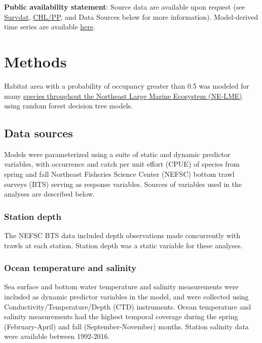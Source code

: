 \documentclass[
]{book}
\begin{document}
\textbf{Public availability statement}: Source data are available upon request (see \protect\hyperlink{survdat}{Survdat}, \protect\hyperlink{chl-pp}{CHL/PP}, and Data Sources below for more information). Model-derived time series are available \href{https://comet.nefsc.noaa.gov/erddap/tabledap/SOE_habitat_soe_v1.html}{here}.

\hypertarget{methods-26}{%
\section{Methods}\label{methods-26}}

Habitat area with a probability of occupancy greater than 0.5 was modeled for many \href{https://www.nefsc.noaa.gov/ecosys/current-conditions/occupancy-change.html}{species throughout the Northeast Large Marine Ecosystem (NE-LME)} using random forest decision tree models.

\hypertarget{data-sources-26}{%
\subsection{Data sources}\label{data-sources-26}}

Models were parameterized using a suite of static and dynamic predictor variables, with occurrence and catch per unit effort (CPUE) of species from spring and fall Northeast Fisheries Science Center (NEFSC) bottom trawl surveys (BTS) serving as response variables. Sources of variables used in the analyses are described below.

\hypertarget{station-depth}{%
\subsubsection{Station depth}\label{station-depth}}

The NEFSC BTS data included depth observations made concurrently with trawls at each station. Station depth was a static variable for these analyses.

\hypertarget{ocean-temperature-and-salinity}{%
\subsubsection{Ocean temperature and salinity}\label{ocean-temperature-and-salinity}}

Sea surface and bottom water temperature and salinity measurements were included as dynamic predictor variables in the model, and were collected using Conductivity/Temperature/Depth (CTD) instruments. Ocean temperature and salinity measurements had the highest temporal coverage during the spring (February-April) and fall (September-November) months. Station salinity data were available between 1992-2016.
\end{document}
